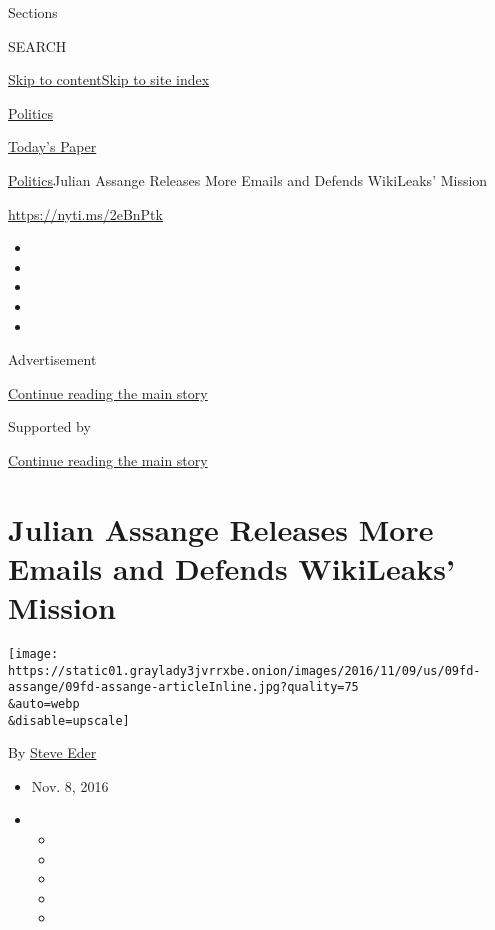 Sections

SEARCH

\protect\hyperlink{site-content}{Skip to
content}\protect\hyperlink{site-index}{Skip to site index}

\href{https://www.nytimes3xbfgragh.onion/section/politics}{Politics}

\href{https://myaccount.nytimes3xbfgragh.onion/auth/login?response_type=cookie\&client_id=vi}{}

\href{https://www.nytimes3xbfgragh.onion/section/todayspaper}{Today's
Paper}

\href{/section/politics}{Politics}\textbar{}Julian Assange Releases More
Emails and Defends WikiLeaks' Mission

\url{https://nyti.ms/2eBnPtk}

\begin{itemize}
\item
\item
\item
\item
\item
\end{itemize}

Advertisement

\protect\hyperlink{after-top}{Continue reading the main story}

Supported by

\protect\hyperlink{after-sponsor}{Continue reading the main story}

\hypertarget{julian-assange-releases-more-emails-and-defends-wikileaks-mission}{%
\section{Julian Assange Releases More Emails and Defends WikiLeaks'
Mission}\label{julian-assange-releases-more-emails-and-defends-wikileaks-mission}}

\texttt{[image: https://static01.graylady3jvrrxbe.onion/images/2016/11/09/us/09fd-assange/09fd-assange-articleInline.jpg?quality=75\\\&auto=webp\\\&disable=upscale]}

By \href{http://www.nytimes3xbfgragh.onion/by/steve-eder}{Steve Eder}

\begin{itemize}
\item
  Nov. 8, 2016
\item
  \begin{itemize}
  \item
  \item
  \item
  \item
  \item
  \end{itemize}
\end{itemize}

